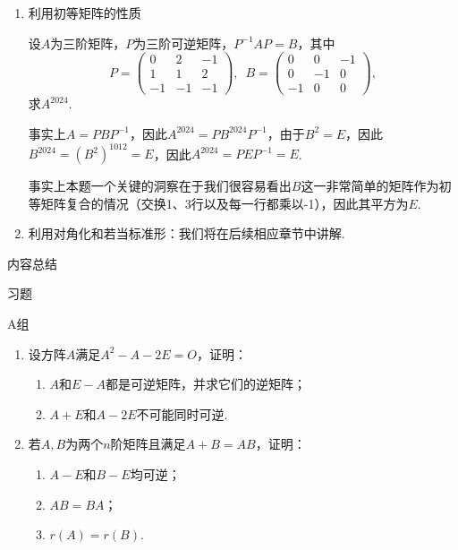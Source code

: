 \begin{enumerate}
    \item 利用初等矩阵的性质
          \begin{example}
              设$A$为三阶矩阵，$P$为三阶可逆矩阵，$P^{-1}AP=B$，其中
              \[P=\begin{pmatrix}
                      0 & 2 & -1 \\ 1 & 1 & 2 \\ -1 & -1 & -1
                  \end{pmatrix},\enspace B=\begin{pmatrix}
                      0 & 0 & -1 \\ 0 & -1 & 0 \\ -1 & 0 & 0
                  \end{pmatrix},\]
              求$A^{2024}$.
          \end{example}
          \begin{solution}
            事实上$A=PBP^{-1}$，因此$A^{2024}=PB^{2024}P^{-1}$，由于$B^2=E$，因此$B^{2024}=(B^2)^{1012}=E$，因此$A^{2024}=PEP^{-1}=E$.
          \end{solution}

          事实上本题一个关键的洞察在于我们很容易看出$B$这一非常简单的矩阵作为初等矩阵复合的情况（交换1、3行以及每一行都乘以-1），因此其平方为$E$.

    \item 利用对角化和若当标准形：我们将在后续相应章节中讲解.
\end{enumerate}

\vspace{2ex}
\centerline{\heiti \Large 内容总结}

\vspace{2ex}
\centerline{\heiti \Large 习题}

\vspace{2ex}
{\kaishu }
\begin{flushright}
    \kaishu

\end{flushright}

\centerline{\heiti A组}
\begin{enumerate}
    \item 设方阵$A$满足$A^2-A-2E=O$，证明：
          \begin{enumerate}
              \item $A$和$E-A$都是可逆矩阵，并求它们的逆矩阵；

              \item $A+E$和$A-2E$不可能同时可逆.
          \end{enumerate}

    \item 若$A,B$为两个$n$阶矩阵且满足$A+B=AB$，证明：
          \begin{enumerate}
              \item $A-E$和$B-E$均可逆；

              \item $AB=BA$；

              \item $r(A)=r(B)$.
          \end{enumerate}
\end{enumerate}

